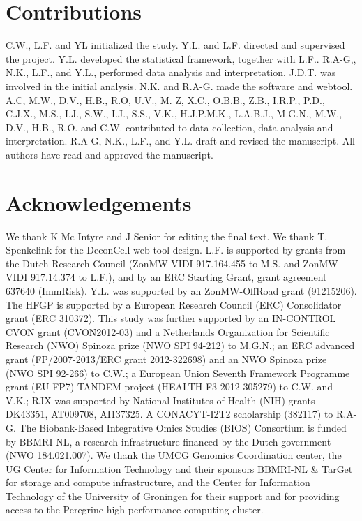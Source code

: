 \section{Contributions}
C.W., L.F. and YL initialized the study. Y.L. and L.F. directed and supervised the project. Y.L. developed the statistical framework, together with L.F.. R.A-G,, N.K., L.F., and Y.L., performed data analysis and interpretation. J.D.T. was involved in the initial analysis. N.K. and R.A-G. made the software and webtool. A.C, M.W., D.V., H.B., R.O, U.V., M. Z, X.C., O.B.B., Z.B., I.R.P., P.D., C.J.X., M.S., I.J., S.W., I.J., S.S., V.K., H.J.P.M.K., L.A.B.J., M.G.N., M.W., D.V., H.B., R.O. and C.W. contributed to data collection, data analysis and interpretation. R.A-G, N.K., L.F., and Y.L. draft and revised the manuscript. All authors have read and approved the manuscript.

\section*{Acknowledgements}
We thank K Mc Intyre and J Senior for editing the final text. We thank T. Spenkelink for the DeconCell web tool design. L.F. is supported by grants from the Dutch Research Council (ZonMW-VIDI 917.164.455 to M.S. and ZonMW-VIDI 917.14.374 to L.F.), and by an ERC Starting Grant, grant agreement 637640 (ImmRisk). Y.L. was supported by an ZonMW-OffRoad grant (91215206). The HFGP is supported by a European Research Council (ERC) Consolidator grant (ERC 310372). This study was further supported by an IN-CONTROL CVON grant (CVON2012-03) and a Netherlands Organization for Scientific Research (NWO) Spinoza prize (NWO SPI 94-212) to M.G.N.; an ERC advanced grant (FP/2007-2013/ERC grant 2012-322698) and an NWO Spinoza prize (NWO SPI 92-266) to C.W.; a European Union Seventh Framework Programme grant (EU FP7) TANDEM project (HEALTH-F3-2012-305279) to C.W. and V.K.; RJX was supported by National Institutes of Health (NIH) grants - DK43351, AT009708, AI137325. A CONACYT-I2T2 scholarship (382117) to R.A-G. The Biobank-Based Integrative Omics Studies (BIOS) Consortium is funded by BBMRI-NL, a research infrastructure financed by the Dutch government (NWO 184.021.007). We thank the UMCG Genomics Coordination center, the UG Center for Information Technology and their sponsors BBMRI-NL \& TarGet for storage and compute infrastructure, and the Center for Information Technology of the University of Groningen for their support and for providing access to the Peregrine high performance computing cluster.

